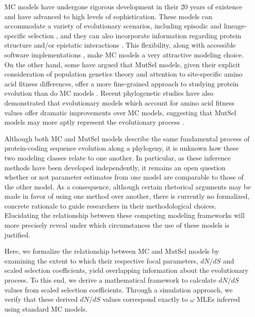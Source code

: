 \documentclass{pnastwo}
\begin{document}
\begin{article}
MC models have undergone rigorous development in their 20 years of existence and have advanced to high levels of sophistication. These models can accommodate a variety of evolutionary scenarios, including episodic \cite{KosakovskyPondetal2011,MEME} and lineage-specific selection \cite{YangNielsen2002,Zhangetal2005,KosakovskyPondFrost2005a}, and they can also incorporate information regarding protein structure and/or epistatic interactions \cite{Robinsonetal2003,Thorneetal2007,Rodrigueetal2009,Scherreretal2012,MeyerWilke2012}. This flexibility, along with accessible software implementations \cite{KosakovskyPondetal2005,Yang2007,Delport2010}, make MC models a very attractive modeling choice. On the other hand, some have argued that MutSel models, given their explicit consideration of population genetics theory and attention to site-specific amino acid fitness differences, offer a more fine-grained approach to studying protein evolution than do MC models \cite{HalpernBruno1998,Rodrigueetal2010,Tamurietal2012,Thorne2012}. Recent phylogenetic studies have also demonstrated that evolutionary models which account for amino acid fitness values offer dramatic improvements over MC models, suggesting that MutSel models may more aptly represent the evolutionary process \cite{Bloom2014a, Bloom2014b}. 

Although both MC and MutSel models describe the same fundamental process of protein-coding sequence evolution along a phylogeny, it is unknown how these two modeling classes relate to one another. In particular, as these inference methods have been developed independently, it remains an open question whether or not parameter estimates from one model are comparable to those of the other model. As a consequence, although certain rhetorical arguments may be made in favor of using one method over another, there is currently no formalized, concrete rationale to guide researchers in their methodological choices. Elucidating the relationship between these competing modeling frameworks will more precisely reveal under which circumstances the use of these models is justified.

Here, we formalize the relationship between MC and MutSel models by examining the extent to which their respective focal parameters, $dN/dS$ and scaled selection coefficients, yield overlapping information about the evolutionary process. To this end, we derive a mathematical framework to calculate $dN/dS$ values from scaled selection coefficients. Through a simulation approach, we verify that these derived $dN/dS$ values correspond exactly to $\omega$ MLEs inferred using standard MC models. 


\end{article}
\end{document}
